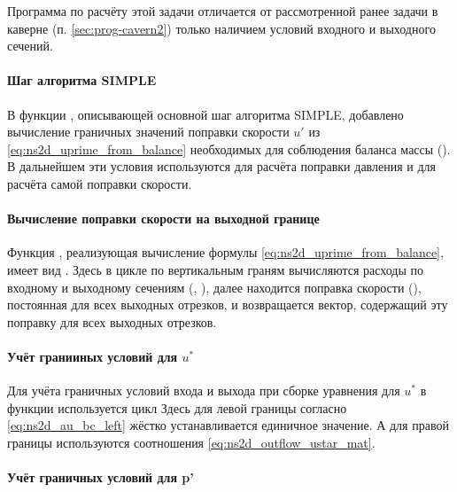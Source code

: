 Программа по расчёту этой задачи отличается от рассмотренной ранее задачи
в каверне (п. \ref{sec:prog-cavern2}) только наличием условий
входного и выходного сечений.

\paragraph{Шаг алгоритма SIMPLE}
В функции , описывающей основной шаг алгоритма SIMPLE,
добавлено вычисление граничных значений поправки скорости $u'$ из \cref{eq:ns2d_uprime_from_balance}
необходимых для соблюдения баланса массы ().
В дальнейшем эти условия используются для расчёта поправки давления
и для расчёта самой поправки скорости. 

\paragraph{Вычисление поправки скорости на выходной границе}
Функция , реализующая вычисление формулы \cref{eq:ns2d_uprime_from_balance},
имеет вид
.
Здесь в цикле по вертикальным граням вычисляются расходы по входному и выходному сечениям
(, ),
далее находится поправка скорости (), постоянная для всех выходных отрезков,
и возвращается вектор, содержащий эту поправку для всех выходных отрезков.

\paragraph{Учёт гранииных условий для $u^*$}
Для учёта граничных условий входа и выхода при сборке уравнения для $u^*$ в функции 
используется цикл
Здесь для левой границы
согласно \cref{eq:ns2d_au_bc_left}
жёстко устанавливается единичное значение.
А для правой границы используются соотношения \cref{eq:ns2d_outflow_ustar_mat}.

\paragraph{Учёт граничных условий для p'}

